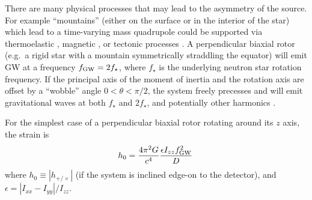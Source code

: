There are many physical processes that may lead to the asymmetry of the source. For example ``mountains'' (either on the surface or in the interior of the star) which lead to a time-varying mass quadrupole could be supported via thermoelastic \citep{Baym1971,Ushomirsky2000,Johnson-McDaniel2013}, magnetic \citep{Cutler2002,Mastrano2011,Lasky2013}, or tectonic processes \citep{Middleditch2006,Chugunov2010,Giliberti2022,Kerin2022}. A perpendicular biaxial rotor (e.g.~a rigid star with a mountain symmetrically straddling the equator) will emit GW at a frequency $f_{\rm GW} = 2f_\star$, where $f_\star$ is the underlying neutron star rotation frequency. If the principal axis of the moment of inertia and the rotation axis are offset by a ``wobble'' angle $0 < \theta < \pi / 2$, the system freely precesses and will emit gravitational waves at both $f_\star$ and $2f_\star$, and potentially other harmonics \citep{Zimmermann1979,Zimmermann1980,Jones2002}. 

For the simplest case of a perpendicular biaxial rotor rotating around its $z$ axis, the strain is \citep{JKS98}
\begin{equation}
    h_0 = \frac{4\pi^2 G}{c^4} \frac{\epsilon I_{zz} f_{\rm GW}^2}{D} \, \label{eq:h0_eps}
\end{equation}
where $h_0 \equiv |h_{+ / \times}|$ (if the system is inclined edge-on to the detector), and $\epsilon =  |I_{xx} - I_{yy}| / I_{zz}$.


